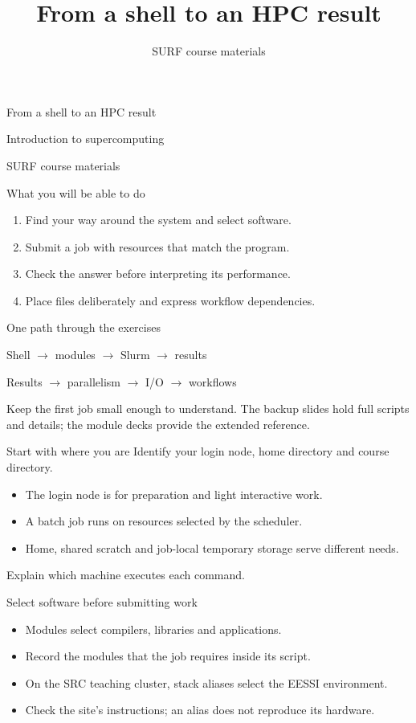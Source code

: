 \documentclass[aspectratio=169,11pt]{beamer}
\title{From a shell to an HPC result}
\author{SURF course materials}
\date{}
\begin{document}
\begin{frame}[plain]
\vfill
{\LARGE From a shell to an HPC result\par}
\bigskip
{\large Introduction to supercomputing\par}
\medskip
SURF course materials
\vfill
\end{frame}
\begin{frame}{What you will be able to do}
\begin{enumerate}
\item Find your way around the system and select software.
\item Submit a job with resources that match the program.
\item Check the answer before interpreting its performance.
\item Place files deliberately and express workflow dependencies.
\end{enumerate}
\end{frame}
\begin{frame}{One path through the exercises}
\begin{center}
Shell $\longrightarrow$ modules $\longrightarrow$ Slurm $\longrightarrow$ results\par\bigskip
Results $\longrightarrow$ parallelism $\longrightarrow$ I/O $\longrightarrow$ workflows
\end{center}
\medskip
Keep the first job small enough to understand. The backup slides hold full
scripts and details; the module decks provide the extended reference.
\end{frame}
\begin{frame}{Start with where you are}
Identify your login node, home directory and course directory.
\begin{itemize}
\item The login node is for preparation and light interactive work.
\item A batch job runs on resources selected by the scheduler.
\item Home, shared scratch and job-local temporary storage serve different needs.
\end{itemize}
Explain which machine executes each command.
\end{frame}
\begin{frame}{Select software before submitting work}
\begin{itemize}
\item Modules select compilers, libraries and applications.
\item Record the modules that the job requires inside its script.
\item On the SRC teaching cluster, stack aliases select the EESSI environment.
\item Check the site's instructions; an alias does not reproduce its hardware.
\end{itemize}
\end{frame}
\end{document}
